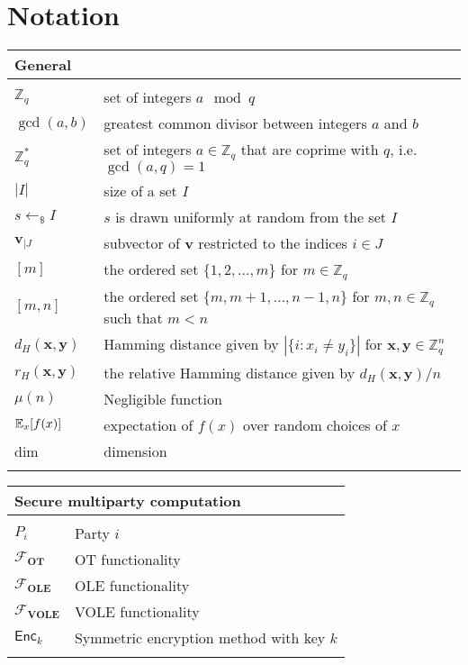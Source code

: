 \chapter*{Notation}


\newcommand{\tabstart}[1]{\noindent \begin{tabular}{p{2.95cm}p{8.7cm}}
    \multicolumn{2}{l}{{\bf #1}} \\ \hline \\[-2.5ex] } 

\newcommand{\tabstop}{\\ \hline \end{tabular}}

\newcommand{\tabinter}{\vspace{1ex}}

\tabstart{General}
$\mathbb{Z}_q$ & set of integers $a \mod q$\\
$\gcd (a,b)$ & greatest common divisor between integers $a$ and $b$ \\
$\mathbb{Z}^*_q$ & set of integers $a\in\mathbb{Z}_q$ that are coprime with $q$, i.e. $\gcd (a,q) = 1$ \\
$|I|$ & size of a set $I$ \\
$s\leftarrow_{\$}I$ & $s$ is drawn uniformly at random from the set $I$ \\
$\bm{v}_{|J}$ & subvector of $\bm{v}$ restricted to the indices $i \in J$ \\
$[m]$ & the ordered set $\{1, 2, \ldots, m\}$ for $m\in \mathbb{Z}_q$ \\
$[m, n]$ & the ordered set $\{m, m+1, \dots, n-1, n\}$ for $m, n\in \mathbb{Z}_q$ such that $m<n$ \\
$d_H(\bm{x}, \bm{y})$ & Hamming distance given by $ |\{ i : x_i \neq y_i \}|$ for $\bm{x},\bm{y}\in\mathbb{Z}^n_q$ \\
$r_H(\bm{x}, \bm{y})$ & the relative Hamming distance given by $d_H(\bm{x}, \bm{y})/n$ \\
$\mu(n)$ & Negligible function \\
  $\operatorname*{\mathbb{E}}_{x}[f(x)]$ & expectation of $f(x)$ over random choices of $x$ \\
  dim & dimension \\
\tabstop

\tabinter

\tabstart{Secure multiparty computation}
$P_i$ & Party $i$ \\
$\mathcal{F}_{\textbf{OT}}$ & OT functionality \\
$\mathcal{F}_{\textbf{OLE}}$ & OLE functionality \\
$\mathcal{F}_{\textbf{VOLE}}$ & VOLE functionality \\
$\mathsf{Enc}_k$ & Symmetric encryption method with key $k$ \\
\tabstop

